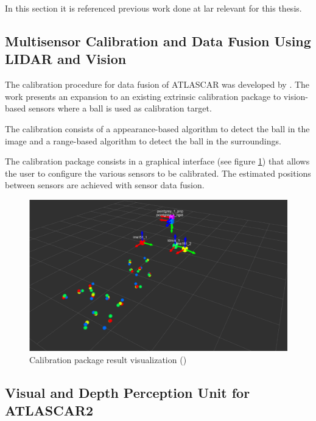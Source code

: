 In this section it is referenced previous work done at \gls{lar} relevant for this thesis.

\subsection{Multisensor Calibration and Data Fusion Using LIDAR and Vision} 

The calibration procedure for data fusion of ATLASCAR was developed by \cite{VieiradaSilva2016}. The work presents an expansion to an existing extrinsic calibration package to vision-based sensors where a ball is used as calibration target. 

The calibration consists of a appearance-based algorithm to detect the ball in the image and a range-based algorithm to detect the ball in the surroundings. 

The calibration package consists in a graphical interface (see figure \ref{fig:david}) that allows the user to configure the various sensors to be calibrated. The estimated positions between sensors are achieved with sensor data fusion.

\begin{figure}[htp]
	
	\centering
	\includegraphics[width=1\textwidth]{capstate/imgs/david.png}
	
	\caption{Calibration package result visualization (\cite{VieiradaSilva2016})}
	\label{fig:david}
	
\end{figure}

\subsection{Visual and Depth Perception Unit for ATLASCAR2} 

